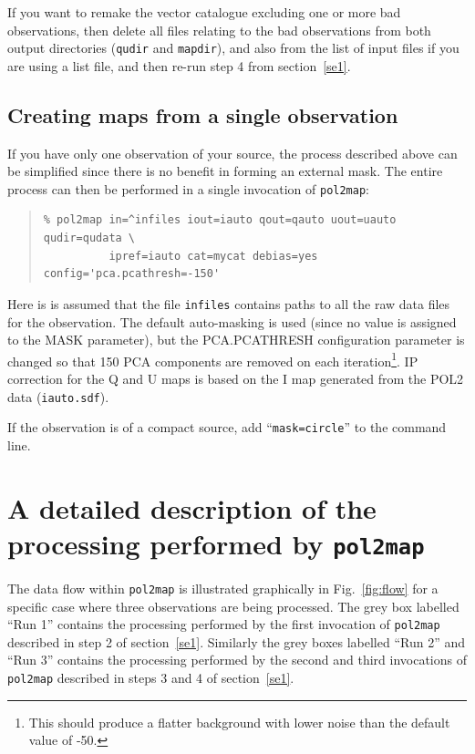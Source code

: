 \documentclass[twoside,11pt]{starlink}
\begin{document}
If you want to remake the vector catalogue excluding one or more bad
observations, then delete all files relating to the bad observations from
both output directories (\texttt{qudir} and \texttt{mapdir}), and also
from the list of input files if you are using a list file, and then
re-run step 4 from section~\ref{se1}.

\subsection{\label{sec:oneobs}Creating maps from a single observation}
If you have only one observation of your source, the process described
above can be simplified since there is no benefit in forming an external
mask. The entire process can then be performed in a single invocation of
\texttt{pol2map}:

\begin{quote}
\begin{verbatim}
% pol2map in=^infiles iout=iauto qout=qauto uout=uauto qudir=qudata \
          ipref=iauto cat=mycat debias=yes config='pca.pcathresh=-150'
\end{verbatim}
\end{quote}

Here is is assumed that the file \texttt{infiles} contains paths to all
the raw data files for the observation. The default auto-masking is
used (since no value is assigned to the MASK parameter), but the
PCA.PCATHRESH configuration parameter is changed so that 150 PCA
components are removed on each iteration\footnote{This should produce a
flatter background with lower noise than the default value of -50.}. IP
correction for the Q and U maps is based on the I map generated from the
POL2 data (\texttt{iauto.sdf}).

If the observation is of a compact source, add ``\texttt{mask=circle}'' 
to the command line.

\section{A detailed description of the processing performed by \texttt{pol2map}}

The data flow within \texttt{pol2map} is illustrated graphically in
Fig.~\ref{fig:flow} for a specific case where three observations are
being processed. The grey box labelled ``Run 1'' contains the processing
performed by the first invocation of \texttt{pol2map} described in step 2
of section~\ref{se1}. Similarly the grey boxes labelled ``Run 2'' and ``Run
3'' contains the processing performed by the second and third invocations
of \texttt{pol2map} described in steps 3 and 4 of section~\ref{se1}.
\end{document}
